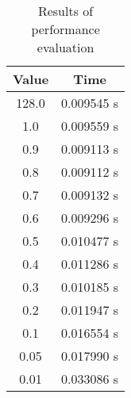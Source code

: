 \begin{table}[H]
\caption{Results of performance evaluation}
\centering
\begin{tabular}{c c}
\hline
\hline %
Value & Time\\ [0.5ex] %
\hline
128.0   & 0.009545 s  \\
1.0   & 0.009559 s  \\
0.9   & 0.009113 s  \\
0.8   & 0.009112 s  \\
0.7   & 0.009132 s  \\
0.6   & 0.009296 s  \\
0.5   & 0.010477 s  \\
0.4   & 0.011286 s  \\
0.3   & 0.010185 s  \\
0.2   & 0.011947 s  \\
0.1   & 0.016554 s  \\
0.05  & 0.017990 s  \\
0.01  & 0.033086 s  \\ [1ex]
\hline
\end{tabular}
\label{table:dist_tol2}
\end{table}